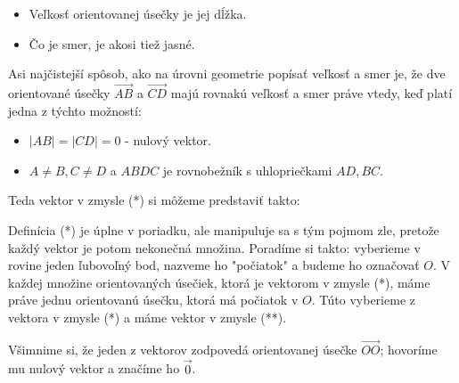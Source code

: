 \documentclass[11pt]{article}
\renewcommand{\vec}[1]{\overrightarrow{#1}}
\begin{document}
\begin{itemize}
    \item Veľkosť orientovanej úsečky je jej dĺžka.
    \item Čo je smer, je akosi tiež jasné.
\end{itemize}

Asi najčistejší spôsob, ako na úrovni geometrie popísať veľkosť a smer je, že dve orientované úsečky $\vec{AB}$ a $\vec{CD}$ majú rovnakú veľkosť a smer práve vtedy, keď platí jedna z týchto možností:
\begin{itemize}
    \item $|AB|=|CD|=0$ - nulový vektor.
    \item $A \neq B, C \neq D$ a $ABDC$ je rovnobežník s uhlopriečkami $AD, BC$.
\end{itemize}

\begin{center}
\end{center}
Teda vektor v zmysle (*) si môžeme predstaviť takto:
\begin{center}
\end{center}
Definícia (*) je úplne v poriadku, ale manipuluje sa s tým pojmom zle, pretože každý vektor je potom nekonečná množina.
Poradíme si takto: vyberieme v rovine jeden ľubovoľný bod, nazveme ho "počiatok" a budeme ho označovať $O$. V každej množine orientovaných úsečiek, ktorá je vektorom v zmysle (*), máme práve jednu orientovanú úsečku, ktorá má počiatok v $O$. Túto vyberieme z vektora v zmysle (*) a máme vektor v zmysle (**).

\begin{center}
\end{center}
Všimnime si, že jeden z vektorov zodpovedá orientovanej úsečke $\vec{OO}$; hovoríme mu nulový vektor a značíme ho $\vec{0}$.
\end{document}
